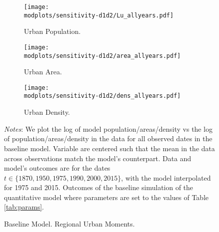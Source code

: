 \documentclass[11pt]{report}
\newcommand{\round}{revision3}  %
\newcommand{\modplots}{../../output/model/plots/\round}
\newcommand{\pthree}{0.37}  %
\begin{document}
\begin{figure}[h]
	\begin{adjustbox}{center}
				\begin{subfigure}{\pthree\textwidth}
			\texttt{[image: \\modplots/sensitivity-d1d2/Lu\_allyears.pdf]}
			\caption{Urban Population.\label{B-fig:model-data-Lu}}
		\end{subfigure}
		\begin{subfigure}{\pthree\textwidth}
			\texttt{[image: \\modplots/sensitivity-d1d2/area\_allyears.pdf]}
			\caption{Urban Area.\label{B-fig:model-data-area}}
		\end{subfigure}
		\begin{subfigure}{\pthree\textwidth}
			\texttt{[image: \\modplots/sensitivity-d1d2/dens\_allyears.pdf]}
			\caption{Urban Density.\label{B-fig:model-data-density}}
		\end{subfigure}
	\end{adjustbox}
	\caption{Baseline Model. Regional Urban Moments.\label{B-fig:model-data}}
	
	{\footnotesize \textit{Notes}: We plot the log of model population/areas/density vs the log of population/areas/density in the data for all observed dates in the baseline model. Variable are centered such that the mean in the data across observations match the model's counterpart. Data and model's outcomes are for the dates $t \in \{1870, 1950, 1975, 1990, 2000, 2015 \}$, with the model interpolated for 1975 and 2015. Outcomes of the baseline simulation of the quantitative model where parameters are set to the values of Table \ref{tab:params}.}
\end{figure}


\pagebreak


\end{document}

